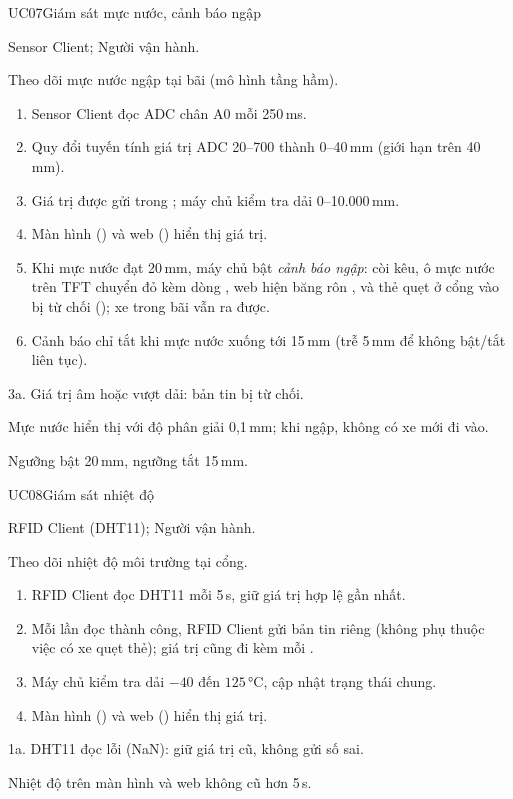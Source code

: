 \begin{usecase}{UC07}{Giám sát mực nước, cảnh báo ngập}
\item[Tác nhân] Sensor Client; Người vận hành.
\item[Mô tả] Theo dõi mực nước ngập tại bãi (mô hình tầng hầm).
\item[Luồng chính] \begin{enumerate}[nosep,leftmargin=1.3em]
  \item Sensor Client đọc ADC chân A0 mỗi 250\,ms.
  \item Quy đổi tuyến tính giá trị ADC 20–700 thành 0–40\,mm (giới hạn trên 40\,mm).
  \item Giá trị được gửi trong ; máy chủ kiểm tra dải 0–10.000\,mm.
  \item Màn hình () và web () hiển thị giá trị.
  \item Khi mực nước đạt 20\,mm, máy chủ bật \emph{cảnh báo ngập}: còi kêu, ô mực nước trên TFT
        chuyển đỏ kèm dòng , web hiện băng rôn , và
        thẻ quẹt ở cổng vào bị từ chối (); xe trong bãi vẫn ra được.
  \item Cảnh báo chỉ tắt khi mực nước xuống tới 15\,mm (trễ 5\,mm để không bật/tắt liên tục).
\end{enumerate}
\item[Ngoại lệ] 3a. Giá trị âm hoặc vượt dải: bản tin bị từ chối.
\item[Hậu điều kiện] Mực nước hiển thị với độ phân giải 0,1\,mm; khi ngập, không có xe mới đi vào.
\item[Thông số] Ngưỡng bật 20\,mm, ngưỡng tắt 15\,mm.
\end{usecase}

\begin{usecase}{UC08}{Giám sát nhiệt độ}
\item[Tác nhân] RFID Client (DHT11); Người vận hành.
\item[Mô tả] Theo dõi nhiệt độ môi trường tại cổng.
\item[Luồng chính] \begin{enumerate}[nosep,leftmargin=1.3em]
  \item RFID Client đọc DHT11 mỗi 5\,s, giữ giá trị hợp lệ gần nhất.
  \item Mỗi lần đọc thành công, RFID Client gửi bản tin  riêng (không phụ thuộc
        việc có xe quẹt thẻ); giá trị cũng đi kèm mỗi .
  \item Máy chủ kiểm tra dải $-40$ đến $125$\,°C, cập nhật trạng thái chung.
  \item Màn hình () và web () hiển thị giá trị.
\end{enumerate}
\item[Ngoại lệ] 1a. DHT11 đọc lỗi (NaN): giữ giá trị cũ, không gửi số sai.
\item[Hậu điều kiện] Nhiệt độ trên màn hình và web không cũ hơn 5\,s.
\end{usecase}

